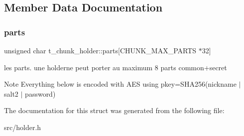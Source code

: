 \subsection{Member Data Documentation}
\mbox{\label{structt__chunk__holder_a170edbd4bb9ca9c4f3e87a8272e6f0df}} 
\subsubsection{\texorpdfstring{parts}{parts}}
{\footnotesize\ttfamily unsigned char t\+\_\+chunk\+\_\+holder\+::parts\mbox{[}C\+H\+U\+N\+K\+\_\+\+M\+A\+X\+\_\+\+P\+A\+R\+TS $\ast$32\mbox{]}}



les parts. une holderne peut porter au maximum 8 parts common+secret 

\begin{DoxyNote}{Note}
Everything below is encoded with A\+ES using pkey=S\+H\+A256(nickname $\vert$ salt2 $\vert$ password) 
\end{DoxyNote}


The documentation for this struct was generated from the following file\+:\begin{DoxyCompactItemize}
\item 
src/holder.\+h\end{DoxyCompactItemize}
